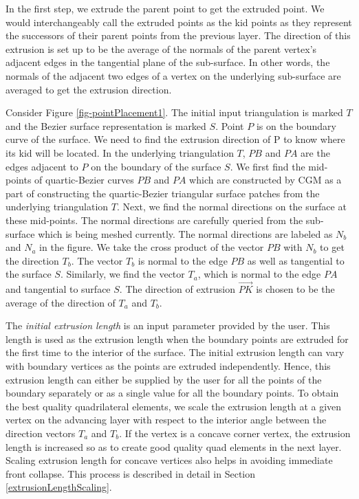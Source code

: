 In the first step, we extrude the parent point to get the extruded point. We would interchangeably call the extruded points as the kid points as they represent the successors of their parent points from the previous layer. The direction of this extrusion is set up to be the average of the normals of the parent vertex's adjacent edges in the tangential plane of the sub-surface. In other words, the normals of the adjacent two edges of a vertex on the underlying sub-surface are averaged to get the extrusion direction.

Consider Figure \ref{fig-pointPlacement1}. The initial input triangulation is marked $T$ and the Bezier surface representation is marked $S$. Point $P$ is on the boundary curve of the surface. We need to find the extrusion direction of P to know where its kid will be located. In the underlying triangulation $T$, $PB$ and $PA$ are the edges adjacent to $P$ on the boundary of the surface $S$. We first find the mid-points of quartic-Bezier curves $PB$ and $PA$ which are constructed by CGM as a part of constructing the quartic-Bezier triangular surface patches from the underlying triangulation $T$. Next, we find the normal directions on the surface at these mid-points. The normal directions are carefully queried from the sub-surface which is being meshed currently. The normal directions are labeled as $N_b$ and $N_a$ in the figure. We take the cross product of the vector $PB$ with $N_b$ to get the direction $T_b$. The vector $T_b$ is normal to the edge $PB$ as well as tangential to the surface $S$. Similarly, we find the vector $T_a$, which is normal to the edge $PA$ and tangential to surface $S$. The direction of extrusion $\overrightarrow{PK}$ is chosen to be the average of the direction of $T_a$ and $T_b$.

The \textit{initial extrusion length} is an input parameter provided by the user. This length is used as the extrusion length when the boundary points are extruded for the first time to the interior of the surface. The initial extrusion length can vary with boundary vertices as the points are extruded independently. Hence, this extrusion length can either be supplied by the user for all the points of the boundary separately or as a single value for all the boundary points. To obtain the best quality quadrilateral elements, we scale the extrusion length at a given vertex on the advancing layer with respect to the interior angle between the direction vectors $T_a$ and $T_b$. If the vertex is a concave corner vertex, the extrusion length is increased so as to create good quality quad elements in the next layer. Scaling extrusion length for concave vertices also helps in avoiding immediate front collapse. This process is described in detail in Section \ref{extrusionLengthScaling}.%

